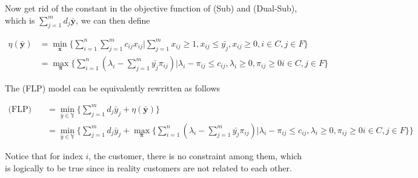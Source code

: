                 Now get rid of the constant in the objective function of (Sub) and (Dual-Sub), which is $\sum_{j = 1}^m d_j \bar{\mathbf{y}}$, we can then define

                \begin{align*}
                    \eta(\bar{\mathbf{y}}) &= \min_\mathbf{x} \{\sum_{i = 1}^n \sum_{j = 1}^m c_{ij} x_{ij} | \sum_{j = 1}^m x_{ij} \ge 1, x_{ij} \le \bar{y_j}, x_{ij} \ge 0, i \in C, j \in F\}\\
                    &= \max_\mathbf{\pi} \{\sum_{i=1}^n (\lambda_i - \sum_{j = 1}^m \bar{y_j} \pi_{ij})|\lambda_i - \pi_{ij} \le c_{ij}, \lambda_i \ge 0, \pi_{ij} \ge 0 i \in C, j \in F\}
                \end{align*}

                The (FLP) model can be equivalently rewritten as follows

                \begin{align*}
                    \text{(FLP)} \quad & = \min_{\bar{y} \in \mathbb{Y}}\{\sum_{j = 1}^m d_j \bar{y}_j + \eta(\bar{\mathbf{y}})\}\\
                    & = \min_{\bar{y} \in \mathbb{Y}} \{\sum_{j = 1}^m d_j \bar{y}_j + \max_\mathbf{\pi} \{\sum_{i=1}^n (\lambda_i - \sum_{j = 1}^m \bar{y_j} \pi_{ij})|\lambda_i - \pi_{ij} \le c_{ij}, \lambda_i \ge 0, \pi_{ij} \ge 0 i \in C, j \in F\}\}
                \end{align*}

                Notice that for index $i$, the customer, there is no constraint among them, which is logically to be true since in reality customers are not related to each other. 

